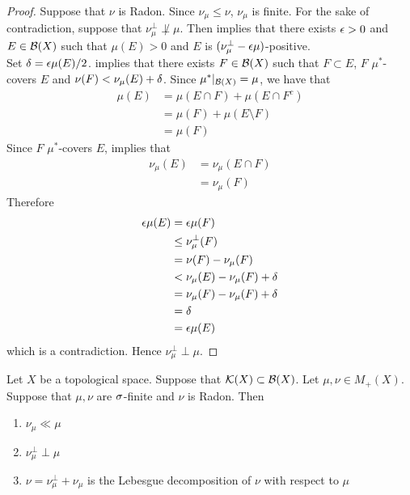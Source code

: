 \documentclass{book}
\begin{document}
	\begin{proof}
		Suppose that $\nu$ is Radon. Since $\nu_{\mu} \leq \nu$, $\nu_{\mu}$ is finite. For the sake of contradiction, suppose that $\nu_{\mu}^{\perp} \not \perp \mu$. Then  implies that there exists $\epsilon >0$ and $E \in \mathcal{B}(X)$ such that $\mu(E) > 0$ and $E$ is $(\nu_{\mu}^{\perp} - \epsilon \mu)$-positive. \\ 
		Set $\delta = \epsilon \mu(E)/2$.  implies that there exists $F \in \mathcal{B}(X)$ such that $F \subset E$, $F$ $\mu^*$-covers $E$ and $\nu(F) < \nu_{\mu}(E) + \delta$. Since $\mu^*|_{\mathcal{B}(X)} = \mu$, we have that 
		\begin{align*}
			\mu(E)
			& = \mu(E \cap F) + \mu(E \cap F^c) \\
			& = \mu(F) + \mu(E \setminus F) \\
			& = \mu(F)
		\end{align*}
		Since $F$ $\mu^*$-covers $E$,  implies that 
		\begin{align*}
			\nu_{\mu}(E)
			& = \nu_{\mu}(E \cap F) \\
			& = \nu_{\mu}(F)
		\end{align*}
		Therefore
		\begin{align*}
			\epsilon \mu(E)
			& = \epsilon \mu(F) \\
			& \leq \nu_{\mu}^{\perp}(F) \\
			& = \nu(F) - \nu_{\mu}(F) \\
			& < \nu_{\mu}(E) - \nu_{\mu}(F) + \delta \\
			& = \nu_{\mu}(F) - \nu_{\mu}(F) + \delta \\
			& = \delta \\
			& = \epsilon \mu(E)
		\end{align*} 
		which is a contradiction. Hence $\nu_{\mu}^{\perp} \perp \mu$. 
	\end{proof}
	
	\begin{ex} 
		Let $X$ be a topological space. Suppose that $\mathcal{K}(X) \subset \mathcal{B}(X)$. Let $\mu, \nu \in M_+(X)$. Suppose that $\mu,\nu$ are $\sigma$-finite and $\nu$ is Radon. Then 
		\begin{enumerate}
			\item $\nu_{\mu} \ll \mu$
			\item $\nu_{\mu}^{\perp} \perp \mu$
			\item $\nu = \nu_{\mu}^{\perp} + \nu_{\mu}$ is the Lebesgue decomposition of $\nu$ with respect to $\mu$
		\end{enumerate}
	\end{ex}
	
\end{document}
